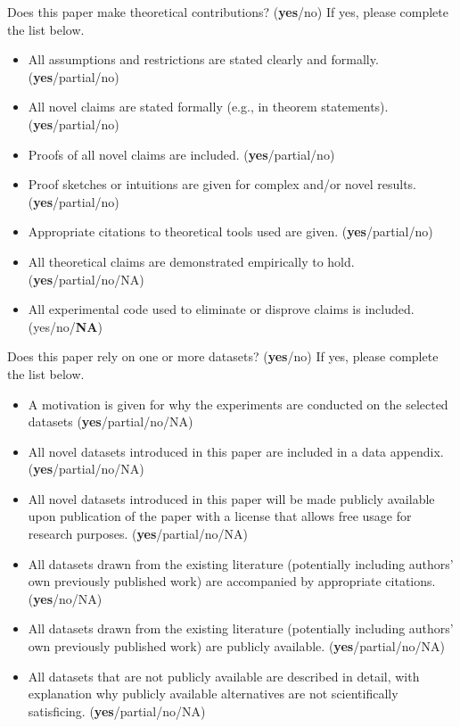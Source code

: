 \documentclass[letterpaper]{article} %
\theoremstyle{remark}
\theoremstyle{definition}
\begin{document}
Does this paper make theoretical contributions? (\textbf{yes}/no) If yes, please
complete the list below.

\begin{itemize}
  \item All assumptions and restrictions are stated clearly and formally.
        (\textbf{yes}/partial/no)
  \item All novel claims are stated formally (e.g., in theorem statements).
        (\textbf{yes}/partial/no)
  \item Proofs of all novel claims are included. (\textbf{yes}/partial/no)
  \item Proof sketches or intuitions are given for complex and/or novel results.
        (\textbf{yes}/partial/no)
  \item Appropriate citations to theoretical tools used are given.
        (\textbf{yes}/partial/no)
  \item All theoretical claims are demonstrated empirically to hold.
        (\textbf{yes}/partial/no/NA)
  \item All experimental code used to eliminate or disprove claims is included.
        (yes/no/\textbf{NA})
\end{itemize}

Does this paper rely on one or more datasets? (\textbf{yes}/no) If yes, please
complete the list below.

\begin{itemize}
  \item A motivation is given for why the experiments are conducted on the
        selected datasets (\textbf{yes}/partial/no/NA)
  \item All novel datasets introduced in this paper are included in a data
        appendix. (\textbf{yes}/partial/no/NA)
  \item All novel datasets introduced in this paper will be made publicly
        available upon publication of the paper with a license that allows free
        usage for research purposes. (\textbf{yes}/partial/no/NA)
  \item All datasets drawn from the existing literature (potentially including
        authors’ own previously published work) are accompanied by appropriate
        citations. (\textbf{yes}/no/NA)
  \item All datasets drawn from the existing literature (potentially including
        authors’ own previously published work) are publicly available.
        (\textbf{yes}/partial/no/NA)
  \item All datasets that are not publicly available are described in detail,
        with explanation why publicly available alternatives are not
        scientifically satisficing. (\textbf{yes}/partial/no/NA)
\end{itemize}
\end{document}
